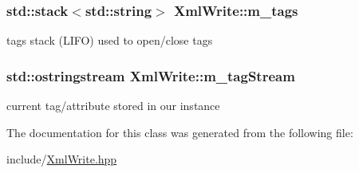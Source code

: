 \subsubsection[{m\+\_\+tags}]{\setlength{\rightskip}{0pt plus 5cm}std\+::stack$<$std\+::string$>$ Xml\+Write\+::m\+\_\+tags\hspace{0.3cm}{\ttfamily [private]}}\label{class_xml_write_a3d08fed96e394c85908f775c2bb2590a}
tags\textquotesingle{} stack (L\+I\+F\+O) used to open/close tags \hypertarget{class_xml_write_a0dc4ac379bc45a84de47edc449efadb3}{}
\subsubsection[{m\+\_\+tag\+Stream}]{\setlength{\rightskip}{0pt plus 5cm}std\+::ostringstream Xml\+Write\+::m\+\_\+tag\+Stream\hspace{0.3cm}{\ttfamily [private]}}\label{class_xml_write_a0dc4ac379bc45a84de47edc449efadb3}
current tag/attribute stored in our instance 

The documentation for this class was generated from the following file\+:\begin{DoxyCompactItemize}
\item 
include/\hyperlink{_xml_write_8hpp}{Xml\+Write.\+hpp}\end{DoxyCompactItemize}
